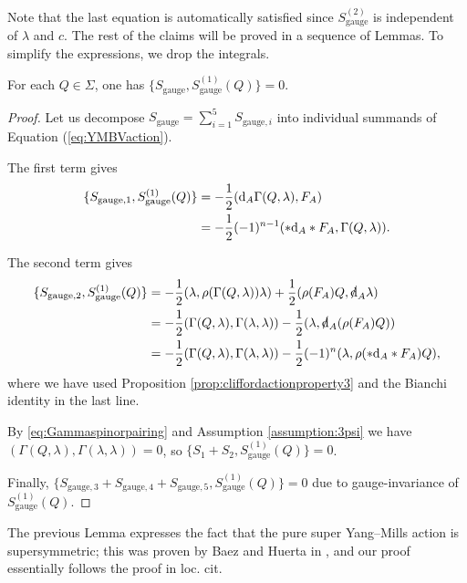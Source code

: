 \documentclass[10pt, oneside]{article}
\newcommand{\gauge}{\mathrm{gauge}}
\begin{document}
Note that the last equation is automatically satisfied since $S_{\gauge}^{(2)}$ is independent of $\lambda$ and $c$. The rest of the claims will be proved in a sequence of Lemmas. To simplify the expressions, we drop the integrals.

\begin{lemma}
For each $Q\in \Sigma$, one has $\{S_{\gauge}, S_{\gauge}^{(1)}(Q)\} = 0$.
\label{lm:gaugemultiplet1}
\end{lemma}
\begin{proof}
Let us decompose $S_{\gauge} = \sum_{i=1}^5 S_{\gauge, i}$ into individual summands of Equation (\ref{eq:YMBVaction}).

The first term gives
\begin{align*}
\{S_{\gauge, 1}, S_{\gauge}^{(1)}(Q)\} &= -\frac{1}{2} (\d_A \Gamma(Q, \lambda), F_A)\\
&= -\frac{1}{2}(-1)^{n-1} (\ast \d_A \ast F_A, \Gamma(Q, \lambda)).
\end{align*}

The second term gives
\begin{align*}
\{S_{\gauge, 2}, S_{\gauge}^{(1)}(Q)\} &= -\frac{1}{2}(\lambda, \rho(\Gamma(Q, \lambda))\lambda) + \frac{1}{2}(\rho(F_A) Q, \sd{\d}_A\lambda) \\
&= -\frac{1}{2}(\Gamma(Q, \lambda), \Gamma(\lambda, \lambda))  - \frac{1}{2}(\lambda, \sd{\d}_A(\rho(F_A) Q)) \\
&= -\frac{1}{2}(\Gamma(Q, \lambda), \Gamma(\lambda, \lambda)) - \frac{1}{2} (-1)^n (\lambda, \rho(\ast \d_A\ast F_A) Q),
\end{align*}
where we have used Proposition \ref{prop:cliffordactionproperty3} and the Bianchi identity in the last line.

By \eqref{eq:Gammaspinorpairing} and Assumption \ref{assumption:3psi} we have $(\Gamma(Q, \lambda), \Gamma(\lambda, \lambda)) = 0$, so $\{S_1 + S_2, S_{\gauge}^{(1)}(Q)\} = 0$.

Finally, $\{S_{\gauge,3} + S_{\gauge,4} + S_{\gauge, 5}, S_{\gauge}^{(1)}(Q)\} = 0$ due to gauge-invariance of $S_{\gauge}^{(1)}(Q)$.
\end{proof}

\begin{remark}
The previous Lemma expresses the fact that the pure super Yang--Mills action is supersymmetric; this was proven by Baez and Huerta in \cite{BaezHuerta}, and our proof essentially follows the proof in loc. cit.
\end{remark}
\end{document}
